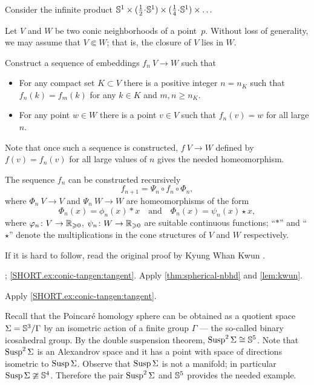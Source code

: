 Consider the infinite product $\SSS^1\times ({\tfrac 12}\cdot \SSS^1)\times ({\tfrac 14}\cdot \SSS^1)\times\dots$

Let $V$ and $W$ be two conic neighborhoods of a point~$p$.
Without loss of generality, we may assume that $V\Subset W$;
that is, the closure of $V$ lies in $W$.

Construct a sequence of embeddings $f_n\:V\to W$
such that 
\begin{itemize}
\item 
For any compact set $K\subset V$ 
there is a positive integer $n=n_K$ such that 
$f_n(k)=f_m(k)$ for any $k\in K$ and $m, n \ge n_K$.
\item For any point $w\in W$ there is a point $v\in V$ such that $f_n(v)=w$ for all large $n$.
\end{itemize}

Note that once such a sequence is constructed, $f\:V\to W$ defined by $f(v)=f_n(v)$ for all large values of $n$ gives the needed homeomorphism.

The sequence $f_n$ can be constructed recursively
\[f_{n+1}=\Psi_n\circ f_n\circ \Phi_n,\]
where $\Phi_n\:V\to V$ 
and $\Psi_n\:W\to W$ 
are homeomorphisms
of the form 
\[\Phi_n(x)=\phi_n(x)\ast x\quad \text{and}\quad \Phi_n(x)=\psi_n(x)\star x,\]
where $\varphi_n\colon V\to \mathbb{R}_{\geqslant 0}$, $\psi_n\colon W\to \mathbb{R}_{\geqslant 0}$ are suitable continuous functions;
``$\ast$'' and ``$\star$'' denote the multiplications in the cone structures of $V$ and $W$ respectively.

 If it is hard to follow, read the original proof by Kyung Whan Kwun \cite{kwun1964}.

\parbf{\ref{ex:conic-tangent}}; \ref{SHORT.ex:conic-tangen:tangent}. Apply \ref{thm:spherical-nbhd} and \ref{lem:kwun}.

 Apply \ref{SHORT.ex:conic-tangen:tangent}.

 Recall that the Poincaré homology sphere can be obtained as a quotient space $\Sigma=\mathbb{S}^3/\Gamma$ by an isometric action of a finite group $\Gamma$  --- the so-called binary icosahedral group.
By the double suspension theorem,  $\mathop{\rm Susp}\nolimits^2\Sigma\cong\mathbb{S}^5$.
Note that $\mathop{\rm Susp}\nolimits^2\Sigma$ is an Alexandrov space and it has a point with space of directions isometric to $\mathop{\rm Susp}\nolimits\Sigma$.
Observe that $\mathop{\rm Susp}\nolimits\Sigma$ is not a manifold; in particular $\mathop{\rm Susp}\nolimits\Sigma\ncong\mathbb{S}^4$.
Therefore the pair $\mathop{\rm Susp}\nolimits^2\Sigma$ and $\mathbb{S}^5$ provides the needed example.

